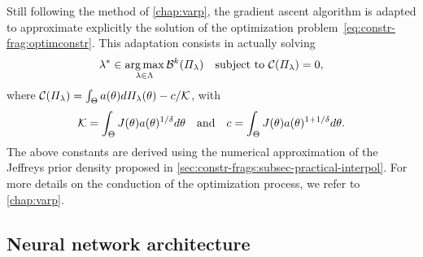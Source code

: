 
Still following the method of   \cref{chap:varp},
the gradient ascent algorithm is adapted to approximate explicitly the solution of the optimization problem~\eqref{eq:constr-frag:optimconstr}.
This adaptation consists in actually solving
    \begin{equation}
        \lambda^\ast\in\operatorname*{arg\,max}_{\lambda\in\Lambda}\mathcal{B}^k(\varPi_\lambda)\quad\text{subject to\ } \mathcal{C}(\varPi_\lambda)=0,
    \end{equation}
where $\mathcal{C}(\varPi_\lambda)=\int_\Theta a(\theta)d\varPi_\lambda(\theta) - c/\mathcal{K}$, with
    \begin{equation}
        \mathcal{K}=\int_\Theta J(\theta)a(\theta)^{1/\delta}d\theta \quad\text{and}\quad
        c = \int_\Theta J(\theta)a(\theta)^{1+1/\delta}d\theta.
    \end{equation}
The above constants are derived using the numerical approximation of the Jeffreys prior density proposed in \cref{sec:constr-frags:subsec-practical-interpol}.
For more details on the conduction of the optimization process, we refer to   \cref{chap:varp}.



\subsection{Neural network architecture}\label{sec:constr-frags:architecture}


